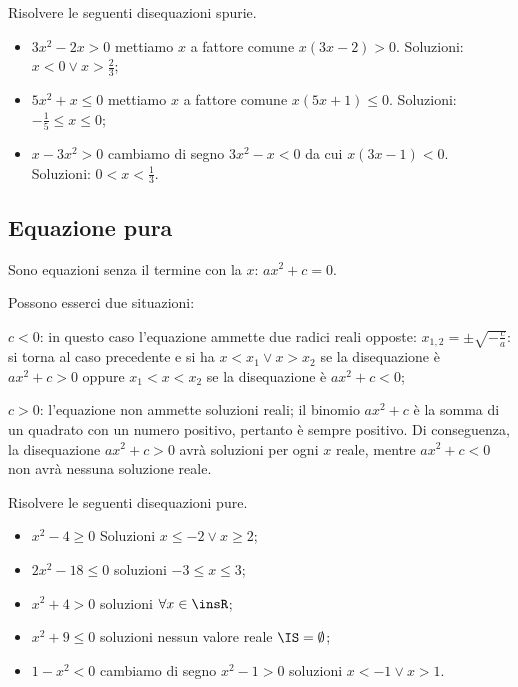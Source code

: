 \begin{exrig}
\begin{esempio}
Risolvere le seguenti disequazioni spurie.
\begin{itemize}
\item $3x^2-2x>0$ mettiamo $x$ a fattore comune $x(3x-2)>0$. Soluzioni: $x<0\vee x>\frac 2 3$;
\item $5x^2+x\le 0$ mettiamo $x$ a fattore comune $x(5x+1)\le 0$. Soluzioni: $-\frac 1 5\le x\le 0$;
\item $x-3x^2>0$ cambiamo di segno $3x^2-x<0$ da cui $x(3x-1)<0$. Soluzioni: $0<x<\frac 1 3$.
\end{itemize}
\end{esempio}
\end{exrig}

\subsection{Equazione pura}
Sono equazioni senza il termine con la $ x $: $ax^2+c=0$.

Possono esserci due situazioni:
\begin{itemize*}
\item $c<0$: in questo caso l'equazione ammette due radici reali opposte: $x_{1,2}=\pm \sqrt{-\frac c a}$: si torna al caso precedente e si ha $x<x_1\vee x>x_2$ se la disequazione è $ax^2+c>0$ oppure $x_1<x<x_2$ se la disequazione è $ax^2+c<0$;
\item $c>0$: l'equazione non ammette soluzioni reali; il binomio $\mathit{ax}^2+c$ è la somma di un quadrato con un numero positivo, pertanto è sempre positivo. Di conseguenza, la disequazione $\mathit{ax}^2+c>0$ avrà soluzioni per ogni $x$ reale, mentre $\mathit{ax}^2+c<0$ non avrà nessuna soluzione reale.
\end{itemize*}

\begin{exrig}
\begin{esempio}
Risolvere le seguenti disequazioni pure.
\begin{itemize}
\item $x^2-4\ge 0$ Soluzioni $x\le -2\vee x\ge 2$;
\item $2x^2-18\le 0$ soluzioni $-3\le x\le 3$;
\item $x^2+4>0$ soluzioni $\forall x\in \insR$;
\item $x^2+9\le 0$ soluzioni nessun valore reale $\IS=\emptyset$;
\item $1-x^2<0$ cambiamo di segno $x^2-1>0$ soluzioni $x<-1\vee x>1$.
\end{itemize}
\end{esempio}
\end{exrig}

